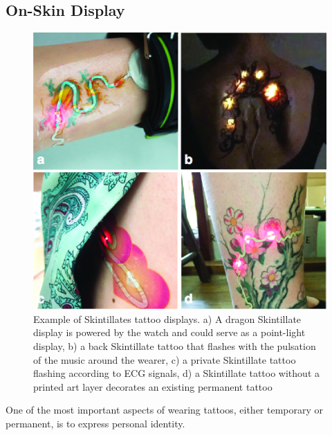 \documentclass{sigchi}
\begin{document}
\subsection{On-Skin Display}
\begin{figure}[!b]
\centering
\includegraphics[width=1\columnwidth]{figures/Figure6}
\caption{Example of Skintillates tattoo displays. a) A dragon Skintillate display is powered by the watch and could serve as a point-light display, b) a back Skintillate tattoo that flashes with the pulsation of the music around the wearer, c) a private Skintillate tattoo flashing according to ECG signals, d) a Skintillate tattoo without a printed art layer decorates an existing permanent tattoo}
\vspace{-8pt}
\label{fig:displays}
\end{figure}
One of the most important aspects of wearing tattoos, either temporary or permanent, is to express personal identity. 
\end{document}
